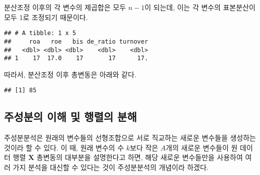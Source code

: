 \documentclass[]{book}
\newenvironment{Shaded}{\begin{snugshade}}{\end{snugshade}}
\newcommand{\CommentTok}[1]{\textcolor[rgb]{0.56,0.35,0.01}{\textit{#1}}}
\newcommand{\ControlFlowTok}[1]{\textcolor[rgb]{0.13,0.29,0.53}{\textbf{#1}}}
\newcommand{\DecValTok}[1]{\textcolor[rgb]{0.00,0.00,0.81}{#1}}
\newcommand{\KeywordTok}[1]{\textcolor[rgb]{0.13,0.29,0.53}{\textbf{#1}}}
\newcommand{\NormalTok}[1]{#1}
\newcommand{\OperatorTok}[1]{\textcolor[rgb]{0.81,0.36,0.00}{\textbf{#1}}}
\newcommand{\StringTok}[1]{\textcolor[rgb]{0.31,0.60,0.02}{#1}}
\begin{document}
분산조정 이후의 각 변수의 제곱합은 모두 \(n - 1\)이 되는데, 이는 각 변수의 표본분산이 모두 1로 조정되기 때문이다.

\begin{Shaded}
\end{Shaded}

\begin{verbatim}
## # A tibble: 1 x 5
##     roa   roe   bis de_ratio turnover
##   <dbl> <dbl> <dbl>    <dbl>    <dbl>
## 1    17  17.0    17       17      17.
\end{verbatim}

따라서, 분산조정 이후 총변동은 아래와 같다.

\begin{Shaded}
\end{Shaded}

\begin{verbatim}
## [1] 85
\end{verbatim}

\hypertarget{pca-intro}{%
\subsection{주성분의 이해 및 행렬의 분해}\label{pca-intro}}

주성분분석은 원래의 변수들의 선형조합으로 서로 직교하는 새로운 변수들을 생성하는 것이라 할 수 있다. 이 때, 원래 변수의 수 \(k\)보다 작은 \(A\)개의 새로운 변수들이 원 데이터 행렬 \(\mathbf{X}\) 총변동의 대부분을 설명한다고 하면, 해당 새로운 변수들만을 사용하여 여러 가지 분석을 대신할 수 있다는 것이 주성분분석의 개념이라 하겠다.
\end{document}
